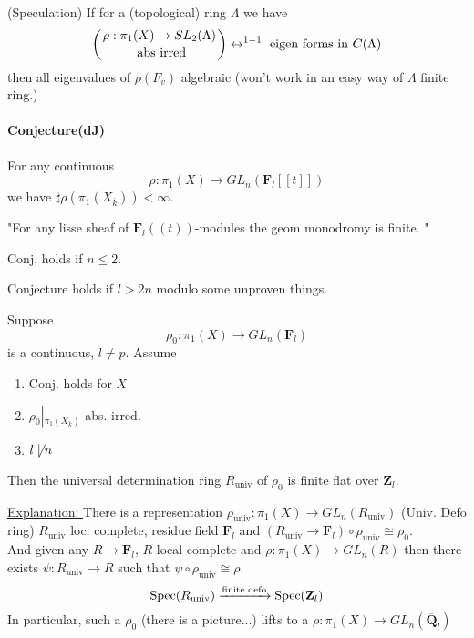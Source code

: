 \noindent
(Speculation) If for a (topological) ring $\Lambda$ we have 
	$$\left({\rho: \pi_1(X)\to SL_2(\Lambda)\atop \text{ abs irred}}\right)\leftrightarrow^{1-1} \text{ eigen forms in } C(\Lambda)$$
	then all eigenvalues of $\rho(F_v)$ algebraic (won't work in an easy way of $\Lambda$ finite ring.)
	
\paragraph{Conjecture(dJ)} For any continuous 
	$$\rho: \pi_1(X)\to GL_n(\mathbf{F}_l[[t]])$$
	we have $\sharp \rho(\pi_1(X_{\overline k}))<\infty$. 
	
	"For any lisse sheaf of $\overline{\mathbf{F}_l((t))}$-modules the geom monodromy is finite. "
	
\begin{theorem}[dJ] Conj. holds if $n\leq 2$. 
\end{theorem}

\begin{theorem}[G] Conjecture holds if $l>2n$ modulo some unproven things. 
\end{theorem}

\begin{theorem}[dJ, 3.5] Suppose
	$$\rho_0: \pi_1(X)\to GL_n(\mathbf{F}_l)$$
	is a continuous, $l\neq p$. Assume
	\begin{enumerate}
	\item Conj. holds for $X$
	\item $\rho_0\left|_{\pi_1(X_{\overline k})}\right.$ abs. irred.
	\item $l\not \mid n$
	\end{enumerate}
	Then the universal determination ring $R_{\text{univ}}$ of $\rho_0$ is finite flat over $\mathbf{Z}_l$. 
\end{theorem}

\noindent
\underline{Explanation: } There is a representation $\rho_{\text{univ}}: \pi_1(X)\to GL_n(R_{\text{univ}})$ (Univ. Defo ring) $R_{\text{univ}}$ loc. complete, residue field $\mathbf{F}_l$ and $(R_{\text{univ}}\to \mathbf{F}_l)\circ\rho_{\text{univ}}\cong\rho_0$. \\
And given any $R\to \mathbf{F}_l$, $R$ local complete and $\rho: \pi_1(X)\to GL_n(R)$ then there exists $\psi: R_{\text{univ}}\to R$ such that $\psi\circ\rho_{\text{univ}}\cong \rho$. 
$$
\text{Spec}(R_{\text{univ}})
\xrightarrow{\text{finite defo}}\\
\text{Spec}(\mathbf{Z}_l)
$$
In particular, such a $\rho_0$ (there is a picture...)
lifts to a $\rho: \pi_1(X)\to GL_n(\overline{\mathbf{Q}}_l)$\\

